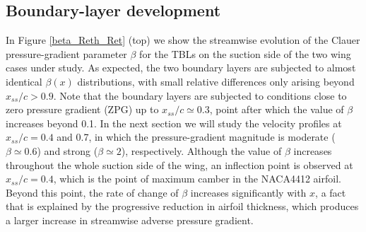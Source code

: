 \documentclass[preprint,12pt,authoryear]{elsarticle}
\begin{document}
\subsection{Boundary-layer development}

In Figure \ref{beta_Reth_Ret} (top) we show the streamwise evolution of the Clauer pressure-gradient parameter $\beta$ for the TBLs on the suction side of the two wing cases under study. As expected, the two boundary layers are subjected to almost identical $\beta(x)$ distributions, with small relative differences only arising beyond $x_{ss}/c > 0.9$. Note that the boundary layers are subjected to conditions close to zero pressure gradient (ZPG) up to $x_{ss}/c \simeq 0.3$, point after which the value of $\beta$ increases beyond 0.1. In the next section we will study the velocity profiles at $x_{ss}/c=0.4$ and 0.7, in which the pressure-gradient magnitude is moderate ($\beta \simeq 0.6$) and strong ($\beta \simeq 2$), respectively. Although the value of $\beta$ increases throughout the whole suction side of the wing, an inflection point is observed at $x_{ss}/c=0.4$, which is the point of maximum camber in the NACA4412 airfoil. Beyond this point, the rate of change of $\beta$ increases significantly with $x$, a fact that is explained by the progressive reduction in airfoil thickness, which produces a larger increase in streamwise adverse pressure gradient.
\end{document}
